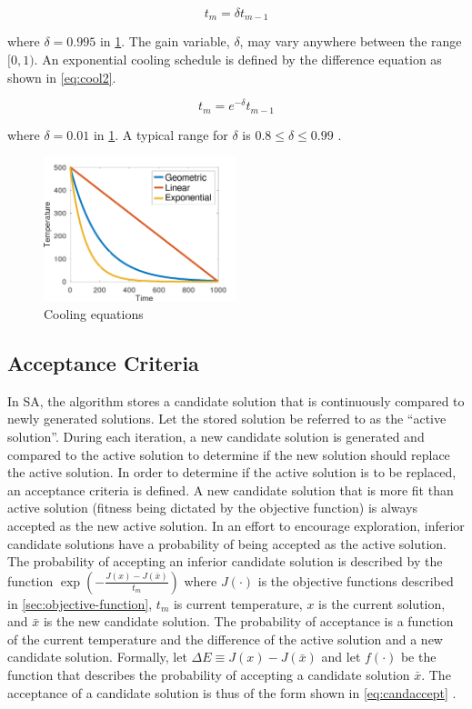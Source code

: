 \documentclass[11pt,a4paper,final]{article}
\begin{document}
\begin{equation}
\label{eq:cool1}
t_m = \delta t_{m-1}
\end{equation}

where \(\delta = 0.995\) in \ref{fig:cool}. The gain variable, \(\delta\), may vary anywhere between the range \([0,1)\). An exponential
cooling schedule is defined by the difference equation as shown in \ref{eq:cool2}.

\begin{equation}
\label{eq:cool2}
t_m = e^{-\delta}t_{m-1}
\end{equation}

where \(\delta = 0.01\) in \ref{fig:cool}. A typical range for \(\delta\) is \(0.8 \le \delta \le 0.99\) \cite{delahaye-2019-simul}.

\begin{figure}[htbp]
\centering
\includegraphics[width=0.5\textwidth]{sections/img/cool_func.png}
\caption{\label{fig:cool}Cooling equations}
\end{figure}

\subsection{Acceptance Criteria}
\label{sec:acceptance}
In SA, the algorithm stores a candidate solution that is continuously compared to newly generated solutions. Let the
stored solution be referred to as the ``active solution''. During each iteration, a new candidate solution is generated
and compared to the active solution to determine if the new solution should replace the active solution. In order to
determine if the active solution is to be replaced, an acceptance criteria is defined. A new candidate solution that is
more fit than active solution (fitness being dictated by the objective function) is always accepted as the new active
solution. In an effort to encourage exploration, inferior candidate solutions have a probability of being accepted as
the active solution. The probability of accepting an inferior candidate solution is described by the function
\(\exp(-\frac{J(x) - J(\bar{x})}{t_m})\) where \(J(\cdot)\) is the objective functions described in \ref{sec:objective-function},
\(t_m\) is current temperature, \(x\) is the current solution, and \(\bar{x}\) is the new candidate solution. The probability
of acceptance is a function of the current temperature and the difference of the active solution and a new candidate
solution. Formally, let \(\Delta E \equiv J(x) - J(\bar{x})\) and let \(f(\cdot)\) be the function that describes the probability of
accepting a candidate solution \(\bar{x}\). The acceptance of a candidate solution is thus of the form shown in
\ref{eq:candaccept} \cite{keller-2019-multi-objec}.
\end{document}
